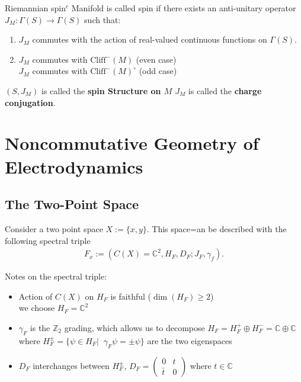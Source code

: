 \documentclass[a4paper]{article}
\theoremstyle{definition}
\theoremstyle{definition}
\theoremstyle{definition}
\theoremstyle{theorem}
\theoremstyle{theorem}
\theoremstyle{theorem}
\begin{document}
    Riemannian spin$^c$ Manifold is called spin if there exists an
    anti-unitary
    operator $J_M:\Gamma(S) \rightarrow \Gamma(S)$ such that:
    \begin{enumerate}
        \item $J_M$ commutes with the action of real-valued  continuous
            functions
            on $\Gamma(S)$.
        \item $J_M$ commutes with $\text{Cliff}^-(M)$ (even case)\\
        $J_M$ commutes with $\text{Cliff}^-(M)^\circ$ (odd case)
    \end{enumerate}
    $(S, J_M)$ is called the \textbf{spin Structure on $M$}
    \newline
    $J_M$ is called the \textbf{charge conjugation}.
    \section{Noncommutative Geometry of Electrodynamics}
    \subsection{The Two-Point Space}
    Consider a two point space $X := \{x, y\}$. This space=an be described
    with
    the following spectral triple
    \begin{align}
        F_x := (C(X) = \mathbb{C}^2, H_F, D_F; J_F, \gamma _f).
    \end{align}

    Notes on the spectral triple:
    \begin{itemize}
        \item Action of $C(X)$ on $H_F$ is faithful ($\dim (H_F) \geq 2$)\\
            we choose $H_F = \mathbb{C}^2$
        \item $\gamma_F$ is the $\mathbb{Z}_2$ grading, which allows us to
            decompose $H_F = H_F^+ \oplus H_F^- = \mathbb{C} \oplus \mathbb{C}$\\
            where $H_F^{\pm} = \{ \psi \in H_F |\;\; \gamma _F \psi = \pm \psi\}$
            are the two eigenspaces
        \item $D_F$ interchanges between $H_F^\pm$, $D_F =
            \begin{pmatrix}0 & t \\ \bar{t} & 0\end{pmatrix}$ where $t \in
                \mathbb{C}$
    \end{itemize}
\end{document}
